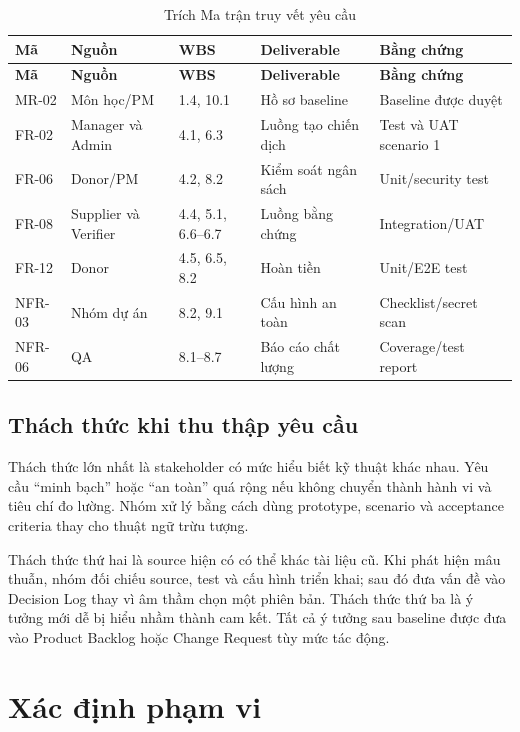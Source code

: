 \begin{longtable}{| p{1.1cm} | p{2.4cm} | p{1.5cm} | p{3cm} | p{3.8cm} |}
\caption{Trích Ma trận truy vết yêu cầu}\label{tab:rtm-sample}\\
\hline
\textbf{Mã} & \textbf{Nguồn} & \textbf{WBS} & \textbf{Deliverable} & \textbf{Bằng chứng} \\
\hline
\endfirsthead
\hline
\textbf{Mã} & \textbf{Nguồn} & \textbf{WBS} & \textbf{Deliverable} & \textbf{Bằng chứng} \\
\hline
\endhead
MR-02 & Môn học/PM & 1.4, 10.1 & Hồ sơ baseline & Baseline được duyệt \\ \hline
FR-02 & Manager và Admin & 4.1, 6.3 & Luồng tạo chiến dịch & Test và UAT scenario 1 \\ \hline
FR-06 & Donor/PM & 4.2, 8.2 & Kiểm soát ngân sách & Unit/security test \\ \hline
FR-08 & Supplier và Verifier & 4.4, 5.1, 6.6--6.7 & Luồng bằng chứng & Integration/UAT \\ \hline
FR-12 & Donor & 4.5, 6.5, 8.2 & Hoàn tiền & Unit/E2E test \\ \hline
NFR-03 & Nhóm dự án & 8.2, 9.1 & Cấu hình an toàn & Checklist/secret scan \\ \hline
NFR-06 & QA & 8.1--8.7 & Báo cáo chất lượng & Coverage/test report \\
\hline
\end{longtable}

\subsection{Thách thức khi thu thập yêu cầu}

Thách thức lớn nhất là stakeholder có mức hiểu biết kỹ thuật khác nhau. Yêu cầu ``minh bạch'' hoặc ``an toàn'' quá rộng nếu không chuyển thành hành vi và tiêu chí đo lường. Nhóm xử lý bằng cách dùng prototype, scenario và acceptance criteria thay cho thuật ngữ trừu tượng.

Thách thức thứ hai là source hiện có có thể khác tài liệu cũ. Khi phát hiện mâu thuẫn, nhóm đối chiếu source, test và cấu hình triển khai; sau đó đưa vấn đề vào Decision Log thay vì âm thầm chọn một phiên bản. Thách thức thứ ba là ý tưởng mới dễ bị hiểu nhầm thành cam kết. Tất cả ý tưởng sau baseline được đưa vào Product Backlog hoặc Change Request tùy mức tác động.

\fi
\section{Xác định phạm vi}
\iffalse

